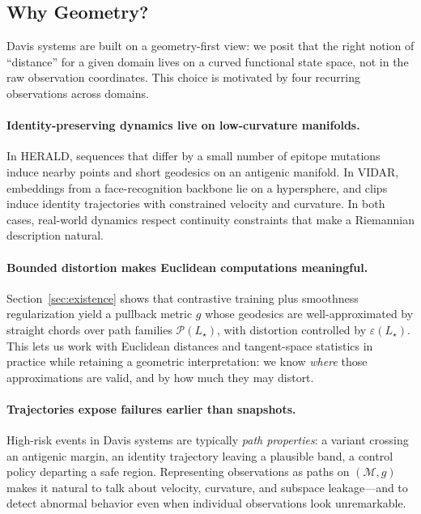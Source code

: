 \documentclass[11pt]{article}
\theoremstyle{remark}
\theoremstyle{plain}
\begin{document}
\subsection{Why Geometry?}

Davis systems are built on a geometry-first view: we posit that the right notion of ``distance'' for a
given domain lives on a curved functional state space, not in the raw observation coordinates. This
choice is motivated by four recurring observations across domains.

\paragraph{Identity-preserving dynamics live on low-curvature manifolds.}
In HERALD, sequences that differ by a small number of epitope mutations induce nearby points
and short geodesics on an antigenic manifold. In VIDAR, embeddings from a face-recognition
backbone lie on a hypersphere, and clips induce identity trajectories with constrained velocity and
curvature. In both cases, real-world dynamics respect continuity constraints that make a
Riemannian description natural.

\paragraph{Bounded distortion makes Euclidean computations meaningful.}
Section~\ref{sec:existence} shows that contrastive training plus smoothness regularization yield a
pullback metric $g$ whose geodesics are well-approximated by straight chords over path families
$\mathcal{P}(L_\star)$, with distortion controlled by $\varepsilon(L_\star)$. This lets us work with
Euclidean distances and tangent-space statistics in practice while retaining a geometric
interpretation: we know \emph{where} those approximations are valid, and by how much they may
distort.

\paragraph{Trajectories expose failures earlier than snapshots.}
High-risk events in Davis systems are typically \emph{path properties}: a variant crossing an antigenic
margin, an identity trajectory leaving a plausible band, a control policy departing a safe
region. Representing observations as paths on $(\mathcal{M},g)$ makes it natural to talk about
velocity, curvature, and subspace leakage---and to detect abnormal behavior even when individual
observations look unremarkable.
\end{document}
